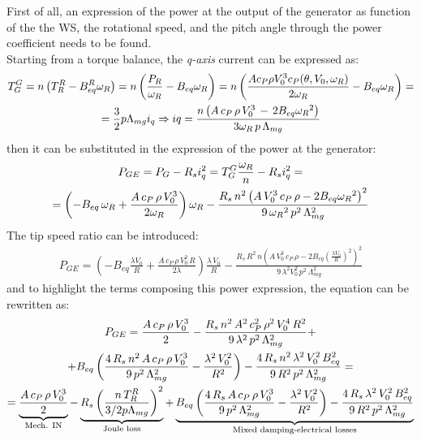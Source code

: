 First of all, an expression of the power at the output of the generator as function of the the WS, the rotational speed, and the pitch angle through the power coefficient needs to be found. \\
Starting from a torque balance, the \textit{q-axis} current can be expressed as:
\begin{gather}
  T_G^G = n\left(T_R^R - B_{eq}^R\omega_R\right) = n\left(\frac{P_R}{\omega_R} - B_{eq}\omega_R\right) = n\left(\frac{A c_P \rho V_0^3 c_P(\theta, V_0, \omega_R)}{2\omega_R} - B_{eq}\omega_R\right) = \notag \\
   = \frac{3}{2}p\Lambda_{mg}i_q \Rightarrow iq = \frac{n\left(A \, c_P \, \rho \, V_0^3 \,-\,2B_{eq}{\omega_R}^2\right)}{3\omega_R\,p\,\Lambda_{mg}} 
\end{gather}
then it can be substituted in the expression of the power at the generator:
\begin{gather}
  P_{GE} = P_{G} - R_s i_q^2 = T_G^G \frac{\omega_R}{n} - R_s i_q^2 = \\ \notag
  = \left(-B_{eq}\,\omega_R + \frac{A\,c_P\,\rho\,V_0^3}{2\omega_R}\right)\omega_R - \frac{R_s\, n^2\left(A\,V_0^3\,c_P\,\rho - 2B_{eq}{\omega_R}^{2}\right)^2}{9\,{\omega_R}^{2}\,p^2\,\Lambda_{mg}^2} \label{eq:P_G_out_eq}
\end{gather}
The tip speed ratio can be introduced:
\begin{gather}
  P_{GE} = \left(-B_{eq}\frac{\lambda V_0}{R} + \frac{A\,c_P\,\rho\,V_0^2\,R}{2\lambda}\right)\frac{\lambda \, V_0}{R} - \frac{R_s\,R^2\,n\left(A\,V_0^3\,c_P\,\rho - 2B_{eq}\left(\frac{\lambda V_0}{R}\right)^2\right)^2}{9\,\lambda^2V_0^2\,p^2\,\Lambda_{mg}^2}\label{eq:P_G_out_lambda}
\end{gather} 
and to highlight the terms composing this power expression, the equation can be rewritten as:
\begin{gather} 
   P_{GE} = \frac{A\,c_P\,\rho\,V_0^3}{2} - \frac{R_s\,n^2\,A^2\,c_P^2\,\rho^2\,V_0^4\,R^2}{9\,\lambda^2\,p^2\,\Lambda_{mg}^2} + \notag \\
   +B_{eq}\left(\frac{4\,R_s\,n^2\,A\,c_P\,\rho\,V_0^3}{9\,p^2\,\Lambda_{mg}^2} - \frac{\lambda^2\,V_0^2}{R^2}\right) - \frac{4\,R_s\,n^2\,\lambda^2\,V_0^2\,B_{eq}^2}{9\,R^2\,p^2\,\Lambda_{mg}^2} =  \notag \\
   = \underbrace{\frac{A\,c_P\,\rho\,V_0^3}{2}}_{\text{Mech. IN}} - \underbrace{R_s \left(\frac{n\,T_R^R}{3/2p\Lambda_{mg}}\right)^2}_{\text{Joule loss}} + \underbrace{B_{eq}\left(\frac{4\,R_s\,A\,c_P\,\rho\,V_0^3}{9\,p^2\,\Lambda_{mg}^2} - \frac{\lambda^2\,V_0^2}{R^2}\right) - \frac{4\,R_s\,\lambda^2\,V_0^2\,B_{eq}^2}{9\,R^2\,p^2\,\Lambda_{mg}^2}}_{\text{Mixed damping-electrical losses}} 
   \label{eq:P_G_out_damping}
\end{gather}

